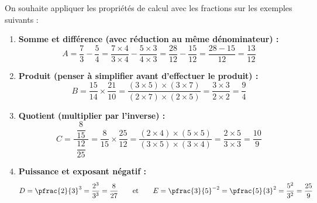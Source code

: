\begin{ex}
	On souhaite appliquer les propriétés de calcul avec les fractions sur les exemples suivants :

	\begin{enumerate}
		\item \textbf{Somme et différence (avec réduction au même dénominateur) :}
		      \[
			      A = \frac{7}{3} - \frac{5}{4} = \frac{7 \times 4}{3 \times 4} - \frac{5 \times 3}{4 \times 3} = \frac{28}{12} - \frac{15}{12} = \frac{28 - 15}{12} = \frac{13}{12}
		      \]

		\item \textbf{Produit (penser à simplifier avant d'effectuer le produit) :}
		      \[
			      B = \frac{15}{14} \times \frac{21}{10} = \frac{(3 \times 5) \times (3 \times 7)}{(2 \times 7) \times (2 \times 5)} = \frac{3 \times 3}{2 \times 2} = \frac{9}{4}
		      \]

		\item \textbf{Quotient (multiplier par l'inverse) :}
		      \[
			      C = \frac{\phantom{i}\dfrac{8}{15}\phantom{i}}{\dfrac{12}{25}} = \frac{8}{15} \times \frac{25}{12} = \frac{(2 \times 4) \times (5 \times 5)}{(3 \times 5) \times (3 \times 4)} = \frac{2 \times 5}{3 \times 3} = \frac{10}{9}
		      \]

		\item \textbf{Puissance et exposant négatif :}
		      \[
			      D = \pfrac{2}{3}^3 = \frac{2^3}{3^3} = \frac{8}{27} \qquad \text{et} \qquad E = \pfrac{3}{5}^{-2} = \pfrac{5}{3}^2 = \frac{5^2}{3^2} = \frac{25}{9}
		      \]
	\end{enumerate}
\end{ex}

